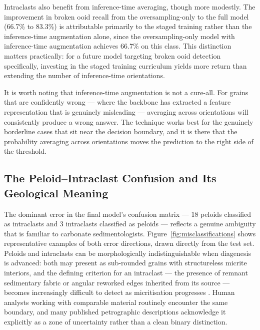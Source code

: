 \documentclass[a4paper,fleqn]{cas-dc}
\begin{document}
Intraclasts also benefit from inference-time averaging, though more modestly. The improvement in broken ooid recall from the oversampling-only to the full model (66.7\% to 83.3\%) is attributable primarily to the staged training rather than the inference-time augmentation alone, since the oversampling-only model with inference-time augmentation achieves 66.7\% on this class. This distinction matters practically: for a future model targeting broken ooid detection specifically, investing in the staged training curriculum yields more return than extending the number of inference-time orientations.

It is worth noting that inference-time augmentation is not a cure-all. For grains that are confidently wrong --- where the backbone has extracted a feature representation that is genuinely misleading --- averaging across orientations will consistently produce a wrong answer. The technique works best for the genuinely borderline cases that sit near the decision boundary, and it is there that the probability averaging across orientations moves the prediction to the right side of the threshold.

\subsection{The Peloid--Intraclast Confusion and Its Geological Meaning}
The dominant error in the final model's confusion matrix --- 18 peloids classified as intraclasts and 3 intraclasts classified as peloids --- reflects a genuine ambiguity that is familiar to carbonate sedimentologists. Figure~\ref{fig:misclassifications} shows representative examples of both error directions, drawn directly from the test set. Peloids and intraclasts can be morphologically indistinguishable when diagenesis is advanced: both may present as sub-rounded grains with structureless micrite interiors, and the defining criterion for an intraclast --- the presence of remnant sedimentary fabric or angular reworked edges inherited from its source --- becomes increasingly difficult to detect as micritisation progresses \citep{flugel2010}. Human analysts working with comparable material routinely encounter the same boundary, and many published petrographic descriptions acknowledge it explicitly as a zone of uncertainty rather than a clean binary distinction.
\end{document}
